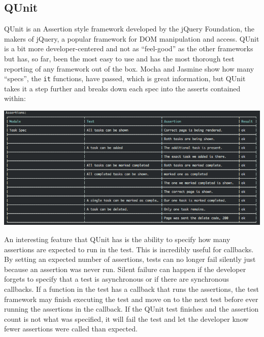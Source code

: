 \documentclass[12pt]{ucthesis}
\newenvironment{Figure}
  {\par\medskip\noindent\minipage{\linewidth}}
  {\endminipage\par\medskip}
\begin{document}
\subsection{QUnit}
QUnit\cite{QUnit} is an Assertion style framework developed by the jQuery Foundation, the makers of jQuery, a popular framework for DOM manipulation and access\cite{jQuery}. QUnit is a bit more developer-centered and not as ``feel-good'' as the other frameworks but has, so far, been the most easy to use and has the most thorough test reporting of any framework out of the box. Mocha and Jasmine show how many ``specs'', the \lstinline{it} functions, have passed, which is great information, but QUnit takes it a step further and breaks down each spec into the asserts contained within:
\begin{Figure}
  \centering
  \includegraphics[width=\linewidth]{qunitrunner.png}
\end{Figure}

An interesting feature that QUnit has is the ability to specify how many assertions are expected to run in the test. This is incredibly useful for callbacks. By setting an expected number of assertions, tests can no longer fail silently just because an assertion was never run. Silent failure can happen if the developer forgets to specify that a test is asynchronous or if there are synchronous callbacks. If a function in the test has a callback that runs the assertions, the test framework may finish executing the test and move on to the next test before ever running the assertions in the callback. If the QUnit test finishes and the assertion count is not what was specified, it will fail the test and let the developer know fewer assertions were called than expected.
\end{document}
